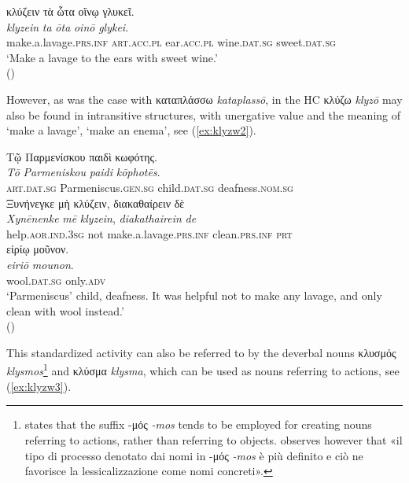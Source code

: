 \documentclass[output=paper,colorlinks,citecolor=brown]{langscibook}
\begin{document}
\begin{exe}
\ex\label{ex:klyzw1}
\glll κλύζειν τὰ ὦτα οἴνῳ γλυκεῖ. \\ 
\textit{klyzein} \textit{ta} \textit{ōta} \textit{oinō} \textit{glykei}. \\
make.a.lavage.\textsc{prs.inf} \textsc{art.acc.pl} ear.\textsc{acc.pl} wine.\textsc{dat.sg} sweet.\textsc{dat.sg} \\
\glt ‘Make a lavage to the ears with sweet wine.' \\
\hspace*{\fill}()
\end{exe}

However, as was the case with καταπλάσσω \textit{kataplassō}, in the HC κλύζω \textit{klyzō} may also be found in intransitive structures, with unergative value and the meaning of ‘make a lavage’, ‘make an enema’, see (\ref{ex:klyzw2}). 

\begin{exe}
\ex\label{ex:klyzw2}
\glll Τῷ Παρμενίσκου παιδὶ κωφότης.   \\ 
\textit{Tō} \textit{Parmeniskou} \textit{paidi} \textit{kōphotēs}.   \\
\textsc{art.dat.sg} Parmeniscus.\textsc{gen.sg} child.\textsc{dat.sg} deafness.\textsc{nom.sg}   \\

\glll Ξυνήνεγκε μὴ κλύζειν, διακαθαίρειν δὲ \\
\textit{Xynēnenke} \textit{mē} \textit{klyzein}, \textit{diakathairein} \textit{de} \\
help.\textsc{aor.ind.3sg} not make.a.lavage.\textsc{prs.inf} clean.\textsc{prs.inf} \textsc{prt} \\

\glll εἰρίῳ μοῦνον. \\
\textit{eiriō} \textit{mounon}. \\
wool.\textsc{dat.sg} only.\textsc{adv} \\
\glt ‘Parmeniscus’ child, deafness. It was helpful not to make any lavage, and only clean with wool instead.' \\
\hspace*{\fill}()
\end{exe}

This standardized activity can also be referred to by the deverbal nouns κλυσμός \textit{klysmos}\footnote{\citet[146--147]{Chantraine1933} states that the suffix -μός \textit{-mos} tends to be employed for creating nouns referring to actions, rather than referring to objects. \citet[152]{Civilleri2012} observes however that «il tipo di processo denotato dai nomi in -μός \textit{-mos} è più definito e ciò ne favorisce la lessicalizzazione come nomi concreti».} and κλύσμα \textit{klysma}, which can be used as nouns referring to actions, see (\ref{ex:klyzw3}). \largerpage
\end{document}
